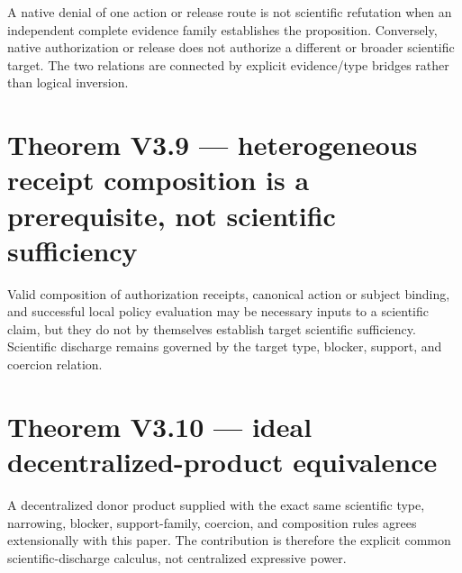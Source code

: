 A native denial of one action or release route is not scientific refutation when an independent complete evidence family establishes the proposition. Conversely, native authorization or release does not authorize a different or broader scientific target. The two relations are connected by explicit evidence/type bridges rather than logical inversion.

\section{Theorem V3.9 --- heterogeneous receipt composition is a prerequisite, not scientific sufficiency}

Valid composition of authorization receipts, canonical action or subject binding, and successful local policy evaluation may be necessary inputs to a scientific claim, but they do not by themselves establish target scientific sufficiency. Scientific discharge remains governed by the target type, blocker, support, and coercion relation.

\section{Theorem V3.10 --- ideal decentralized-product equivalence}

A decentralized donor product supplied with the exact same scientific type, narrowing, blocker, support-family, coercion, and composition rules agrees extensionally with this paper. The contribution is therefore the explicit common scientific-discharge calculus, not centralized expressive power.

